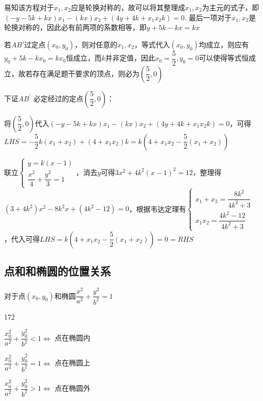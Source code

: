 \begin{enumerate}
\begin{jieda}
        易知该方程对于$x_1, x_2$应是轮换对称的，故可以将其整理成$x_1, x_2$为主元的式子，即$\left(-y -5k+kx\right)x_1  - (kx)x_2 + \left(4y+4k+x_1x_2k\right) = 0$. 最后一项对于$x_1, x_2$是轮换对称的，因此必有前两项的系数相等，即$y + 5k - kx = kx$

        若$AB'$过定点$(x_0, y_0)$，则对任意的$x_1, x_2$，等式代入$(x_0, y_0)$均成立，则应有$y_0 + 5k - kx_0 = kx_0$恒成立，而$k$并非定值，因此$x_0 = \dfrac{5}{2}, y_0 = 0$可以使得等式恒成立，故若存在满足题干要求的顶点，则必为$\left(\dfrac{5}{2}, 0\right)$

        下证$A{B}^{\prime }$ 必定经过的定点$\left(\dfrac{5}{2}, 0\right)$：

        将$\left(\dfrac{5}{2}, 0\right)$代入$\left(-y -5k+kx\right)x_1  - (kx)x_2 + \left(4y+4k+x_1x_2k\right) = 0$，可得$LHS = -\dfrac{5}{2}k(x_1+x_2)+(4+x_1x_2)k = k\left(4+x_1x_2-\dfrac{5}{2}(x_1+x_2)\right)$
        
        联立$\left\{\begin{array}{l}
                y = k(x-1) \\
                \dfrac{x^2}{4} + \dfrac{{y}^{2}}{3} = 1
        \end{array}\right.$，消去$y$可得$3x^2+4k^2(x-1)^2 = 12$，整理得$(3+4k^2)x^2-8k^2x+(4k^2-12) = 0$，根据韦达定理有$\left\{\begin{array}{l}
                x_1+x_2 = \dfrac{8k^2}{4k^2+3} \\
                x_1x_2 = \dfrac{4k^2-12}{4k^2+3}
        \end{array}\right.$，代入可得$LHS = k\left(4+x_1x_2-\dfrac{5}{2}(x_1+x_2)\right) = 0 = RHS$
    \end{jieda}
\end{enumerate}

\subsection*{点和和椭圆的位置关系}
对于点$(x_0, y_0)$和椭圆$\dfrac{x^2}{a^2}+\dfrac{y^2}{b^2} = 1$
\begin{dingautolist}{172}
        \item $\dfrac{x_0^2}{a^2}+\dfrac{y_0^2}{b^2} < 1 \Longleftrightarrow$ 点在椭圆内
        \item $\dfrac{x_0^2}{a^2}+\dfrac{y_0^2}{b^2} = 1 \Longleftrightarrow$ 点在椭圆上
        \item $\dfrac{x_0^2}{a^2}+\dfrac{y_0^2}{b^2} > 1 \Longleftrightarrow$ 点在椭圆外
    \end{dingautolist}


